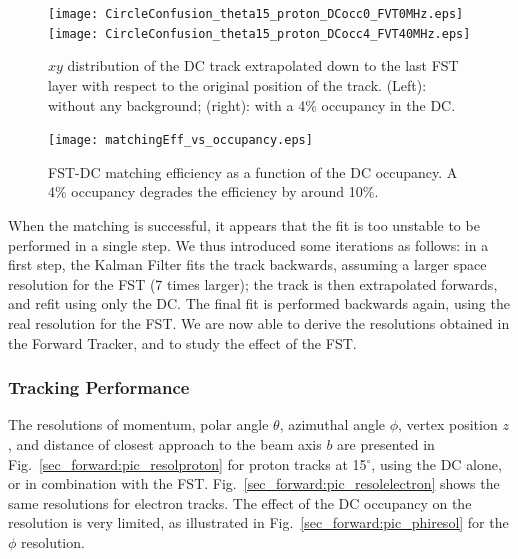 \begin{figure}[ht!]
\centering
\texttt{[image: CircleConfusion\_theta15\_proton\_DCocc0\_FVT0MHz.eps]}
\texttt{[image: CircleConfusion\_theta15\_proton\_DCocc4\_FVT40MHz.eps]}
\caption{\small{$xy$ distribution of the DC track extrapolated down to the last FST 
layer with respect to the original position of the track. (Left): without any 
background; (right): with a 4\% occupancy in the DC.}}
\label{sec_forward:pic_matching}
\end{figure}

\begin{figure}[ht!]
\centering
\texttt{[image: matchingEff\_vs\_occupancy.eps]}
\caption{\small{FST-DC matching efficiency as a function of the DC occupancy.  A
4\% occupancy degrades the efficiency by around 10\%.}}
\label{sec_forward:pic_matcheff}
\end{figure}

When the matching is successful, it appears that the fit is too unstable to be 
performed in a single step.  We thus introduced some iterations as follows: in a 
first step, the Kalman Filter fits the track backwards, assuming a larger space 
resolution for the FST (7 times larger); the track is then extrapolated forwards, 
and refit using only the DC.  The final fit is performed backwards again, using the 
real resolution for the FST.  We are now able to derive the resolutions obtained in 
the Forward Tracker, and to study the effect of the FST.

\subsubsection{Tracking Performance}

The resolutions of momentum, polar angle $\theta$, azimuthal angle $\phi$, vertex 
position $z$, and distance of closest approach to the beam axis $b$ are presented in 
Fig.~\ref{sec_forward:pic_resolproton} for proton tracks at 15$^\circ$, using the DC 
alone, or in combination with the FST.  Fig.~\ref{sec_forward:pic_resolelectron} shows 
the same resolutions for electron tracks.  The effect of the DC occupancy on the 
resolution is very limited, as illustrated in Fig.~\ref{sec_forward:pic_phiresol} for 
the $\phi$ resolution.

